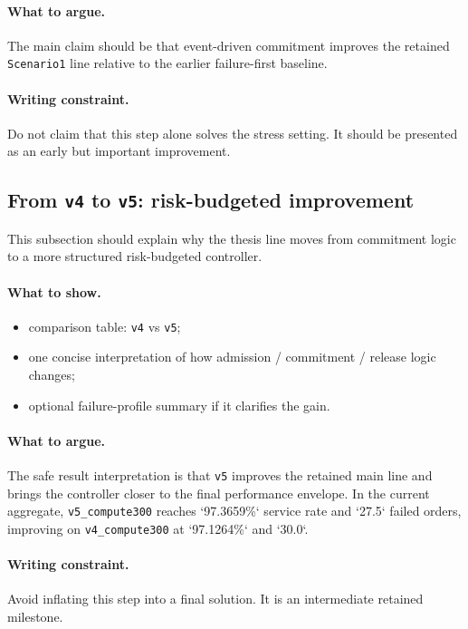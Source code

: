 \paragraph{What to argue.}
The main claim should be that event-driven commitment improves the retained \texttt{Scenario1} line relative to the earlier failure-first baseline.

\paragraph{Writing constraint.}
Do not claim that this step alone solves the stress setting.
It should be presented as an early but important improvement.

\subsection{From \texttt{v4} to \texttt{v5}: risk-budgeted improvement}
\label{sec:results-v4-v5}

This subsection should explain why the thesis line moves from commitment logic to a more structured risk-budgeted controller.

\paragraph{What to show.}
\begin{itemize}
    \item comparison table: \texttt{v4} vs \texttt{v5};
    \item one concise interpretation of how admission / commitment / release logic changes;
    \item optional failure-profile summary if it clarifies the gain.
\end{itemize}

\paragraph{What to argue.}
The safe result interpretation is that \texttt{v5} improves the retained main line and brings the controller closer to the final performance envelope.
In the current aggregate, \texttt{v5\_compute300} reaches `97.3659\%` service rate and `27.5` failed orders, improving on \texttt{v4\_compute300} at `97.1264\%` and `30.0`.

\paragraph{Writing constraint.}
Avoid inflating this step into a final solution.
It is an intermediate retained milestone.

